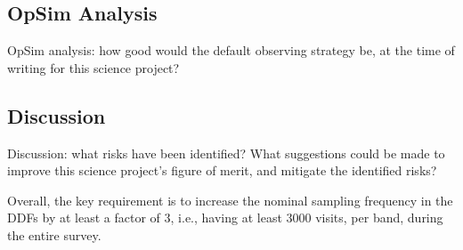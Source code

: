 \subsection{OpSim Analysis}
\label{sec:\secname:analysis}

OpSim analysis: how good would the default observing strategy be, at
the time of writing for this science project?



\subsection{Discussion}
\label{sec:\secname:discussion}

Discussion: what risks have been identified? What suggestions could be
made to improve this science project's figure of merit, and mitigate
the identified risks?

Overall, the key requirement is to increase the nominal sampling frequency
in the DDFs by at least a factor of 3, i.e., having at least 3000 visits,
per band, during the entire survey.


\navigationbar

